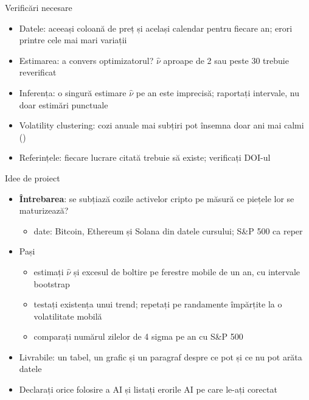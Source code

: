 \begin{frame}{Verificări necesare}
\itemsize{\small}
\begin{itemize}
    \item Datele: aceeași coloană de preț și același calendar pentru fiecare an; erori printre cele mai mari variații
    \item Estimarea: a convers optimizatorul? $\hat\nu$ aproape de 2 sau peste 30 trebuie reverificat
    \item Inferența: o singură estimare $\hat\nu$ pe an este imprecisă; raportați intervale, nu doar estimări punctuale
    \item Volatility clustering: cozi anuale mai subțiri pot însemna doar ani mai calmi ()
    \item Referințele: fiecare lucrare citată trebuie să existe; verificați DOI-ul
\end{itemize}
\end{frame}

\begin{frame}{Idee de proiect}
\itemsize{\small}
\begin{itemize}
    \item \textbf{Întrebarea}: se subțiază cozile activelor cripto pe măsură ce piețele lor se maturizează?
    \begin{itemize}
        \item date: Bitcoin, Ethereum și Solana din datele cursului; S\&P 500 ca reper
    \end{itemize}
    \item Pași
    \begin{itemize}
        \item estimați $\hat\nu$ și excesul de boltire pe ferestre mobile de un an, cu intervale bootstrap
        \item testați existența unui trend; repetați pe randamente împărțite la o volatilitate mobilă
        \item comparați numărul zilelor de 4 sigma pe an cu S\&P 500
    \end{itemize}
    \item Livrabile: un tabel, un grafic și un paragraf despre ce pot și ce nu pot arăta datele
    \item Declarați orice folosire a AI și listați erorile AI pe care le-ați corectat
\end{itemize}
\end{frame}


